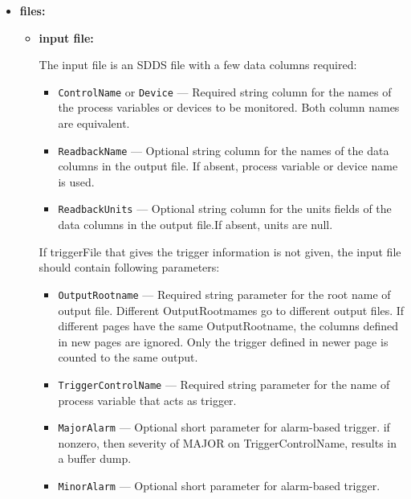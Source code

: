 \begin{itemize}
\begin{verbatim}
        [-sampleInterval=<secs>] [-time=<real-value>[,<time-units>]
        [-circularBuffer=[before=<number>,][after=<number>]]
        [-holdoffTime=<seconds>] [-autoHoldoff]
        [-inhibitPV=name=<name>[,pendIOTime=<seconds>][,waitTime=<seconds>]]
        [-conditions=<filename>,{allMustPass | oneMustPass}]
        [-verbose] [-watchInput] [-lockFile=<filename>[,verbose]] 
Writes values of process variables or devices to a binary SDDS file.
\end{verbatim}
\item {\bf files:}
\begin{itemize}
\item {\bf input file:}\par
The input file is an SDDS file with a few data columns required:
\begin{itemize}
        \item {\tt ControlName} or {\tt Device} --- Required string column for the names of the process variables
                or devices to be monitored. Both column names are equivalent.
        \item {\tt ReadbackName} --- Optional string column for the names of the data columns in the 
                output file. If absent, process variable or device name is used.
        \item {\tt ReadbackUnits} --- Optional string column for the units fields of the data columns in the 
                output file.If absent, units are null.
\end{itemize}
If triggerFile that gives the trigger information is not given, the input file should contain following
parameters:
\begin{itemize}
        \item {\tt OutputRootname} --- Required string parameter for the root name of output file.
                Different OutputRootmames go to different output files. If different pages have the same 
                OutputRootname, the columns defined in new pages are ignored. Only the trigger defined in
                newer page is counted to the same output.
        \item {\tt TriggerControlName} --- Required string parameter for the name of process variable that
                acts as trigger.
        \item {\tt MajorAlarm}  --- Optional short parameter for alarm-based trigger.
                if nonzero, then severity of MAJOR on TriggerControlName, results in a buffer dump.
        \item {\tt MinorAlarm}  --- Optional short parameter for alarm-based trigger.

\end{itemize}
\end{itemize}
\end{itemize}

